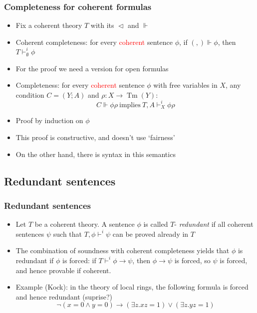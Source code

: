 \documentclass[handout,11pt]{beamer}
\newcommand{\red}[1]{\textcolor{red}{#1}}
\newcommand{\es}{\emptyset}
\newcommand{\covd}{\mathrel{\vartriangleleft}}
\DeclareMathOperator{\Tm}{Tm}
\begin{document}
\begin{frame}
\frametitle{Completeness for coherent formulas}
 \begin{itemize}[<+->]
  \item Fix a coherent theory $T$ with its $\covd$ and $\Vdash$
  \item Coherent completeness: for every \red{coherent} sentence
  $\phi$, if $(,)\Vdash\phi$, then $T\vdash_{\es}^i \phi$
  \item For the proof we need a version 
  for open formulas 
  \item Completeness: for every \red{coherent} sentence
  $\phi$ with free variables in $X$, any condition $C=(Y;A)$
  and $\rho: X\to\Tm(Y)$:
  $$C\Vdash \phi\rho~\text{implies}~T,A\vdash_X^i \phi\rho$$
  \item Proof by induction on $\phi$
  \item This proof is constructive, and doesn't use `fairness'
  \item On the other hand, there is syntax in this semantics
 \end{itemize}
\end{frame}

\subsection{Redundant sentences}

\begin{frame}
\frametitle{Redundant sentences}
 \begin{itemize}[<+->]
  \item Let $T$ be a coherent theory. A sentence $\phi$ is called
  $T$- \emph{redundant} if all coherent sentences $\psi$ such that 
  $T,\phi \vdash^i \psi$ can be proved already in $T$
  \item The combination of soundness with coherent completeness
  yields that $\phi$ is redundant if $\phi$ is forced:
  if $T\vdash^i \phi\to\psi$, then $\phi\to\psi$ is forced,
  so $\psi$ is forced, and hence provable if coherent.
  \item Example (Kock): in the theory of local rings, the following
  formula is forced and hence redundant (suprise?)
  $$\neg(x=0\land y=0) \to (\exists z.xz=1) \lor (\exists z.yz=1)$$
 \end{itemize}
\end{frame}

\end{document}

